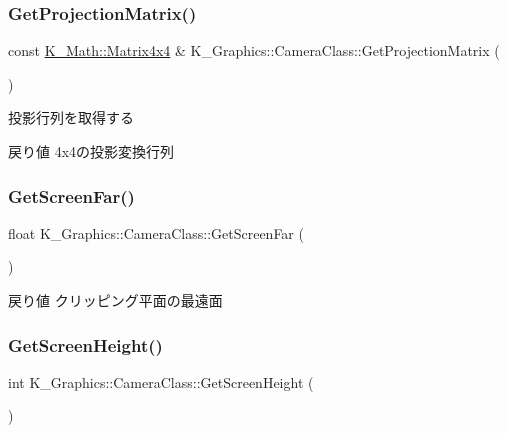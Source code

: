 \subsubsection{\texorpdfstring{Get\+Projection\+Matrix()}{GetProjectionMatrix()}}
{\footnotesize\ttfamily const \mbox{\hyperlink{namespace_k___math_a345271af9d32dff2c964bc679b13b45c}{K\+\_\+\+Math\+::\+Matrix4x4}} \& K\+\_\+\+Graphics\+::\+Camera\+Class\+::\+Get\+Projection\+Matrix (\begin{DoxyParamCaption}{ }\end{DoxyParamCaption})}



投影行列を取得する 

\begin{DoxyReturn}{戻り値}
4x4の投影変換行列 
\end{DoxyReturn}
\mbox{\label{class_k___graphics_1_1_camera_class_ad7b0263ca8ed5d8b36adda3d9209600d}} 
\subsubsection{\texorpdfstring{Get\+Screen\+Far()}{GetScreenFar()}}
{\footnotesize\ttfamily float K\+\_\+\+Graphics\+::\+Camera\+Class\+::\+Get\+Screen\+Far (\begin{DoxyParamCaption}{ }\end{DoxyParamCaption})}

\begin{DoxyReturn}{戻り値}
クリッピング平面の最遠面 
\end{DoxyReturn}
\mbox{\label{class_k___graphics_1_1_camera_class_a62cca8a08a917056082dacc1f56d05ba}} 
\subsubsection{\texorpdfstring{Get\+Screen\+Height()}{GetScreenHeight()}}
{\footnotesize\ttfamily int K\+\_\+\+Graphics\+::\+Camera\+Class\+::\+Get\+Screen\+Height (\begin{DoxyParamCaption}{ }\end{DoxyParamCaption})}

